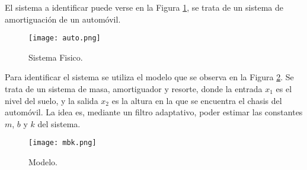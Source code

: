 
	El sistema a identificar puede verse en la Figura \ref{fig:auto}, se trata de un sistema de amortiguación de un automóvil. 

\vspace*{\fill}
\begin{figure}[H]
\centering
\texttt{[image: auto.png]}
\caption{Sistema Fisico.}
\label{fig:auto} 
\end{figure}
\vspace*{\fill}

	Para identificar el sistema se utiliza el modelo que se observa en la Figura \ref{fig:mbk}. Se trata de un sistema de masa, amortiguador y resorte, donde la entrada $x_{1}$ es el nivel del suelo, y la salida $x_{2}$ es la altura en la que se encuentra el chasis del automóvil. La idea es, mediante un filtro adaptativo, poder estimar las constantes $m$, $b$ y $k$ del sistema.

\vspace*{\fill}
\begin{figure}[H]
\centering
\texttt{[image: mbk.png]}
\caption{Modelo.}
\label{fig:mbk} 
\end{figure}
\vspace*{\fill}
